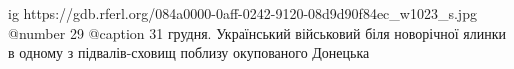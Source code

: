  
 
 
 
 

\ifcmt
  ig https://gdb.rferl.org/084a0000-0aff-0242-9120-08d9d90f84ec_w1023_s.jpg
	@number 29
  @caption 31 грудня. Український військовий біля новорічної ялинки в одному з підвалів-сховищ поблизу окупованого Донецька
\fi
